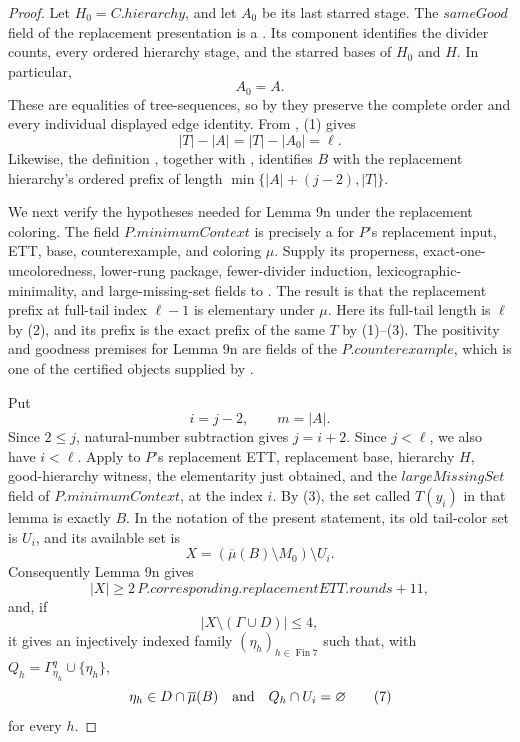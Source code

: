 \begin{proof}
Let \(H_0=C.\mathit{hierarchy}\), and let \(A_0\) be its last starred
stage.  The \(\mathit{sameGood}\) field of the replacement presentation is a
.  Its  component
identifies the divider counts, every ordered hierarchy stage, and the
starred bases of \(H_0\) and \(H\).  In particular,
\[
                         A_0=A.                              \tag{1}
\]
These are equalities of tree-sequences, so by
 they preserve the complete order and
every individual displayed edge identity.  From
, (1) gives
\[
 |T|-|A|=|T|-|A_0|=\ell.                                    \tag{2}
\]
Likewise, the definition , together with
, identifies \(B\) with the replacement
hierarchy's ordered prefix of length
\(\min\{|A|+(j-2),|T|\}\).                                  

We next verify the hypotheses needed for Lemma 9n under the replacement
coloring.  The field \(P.\mathit{minimumContext}\) is precisely a
 for \(P\)'s replacement
input, ETT, base, counterexample, and coloring \(\mu\).  Supply its
properness, exact-one-uncoloredness, lower-rung package, fewer-divider
induction, lexicographic-minimality, and large-missing-set fields to
.  The result is
that the replacement prefix at full-tail index \(\ell-1\) is elementary
under \(\mu\).  Here its full-tail length is \(\ell\) by (2), and its
prefix is the exact prefix of the same \(T\) by (1)--(3).  The positivity
and goodness premises for Lemma 9n are fields of the
 \(P.\mathit{counterexample}\), which is
one of the certified objects supplied by
.

Put
\[
                        i=j-2,\qquad m=|A|.
\]
Since \(2\le j\), natural-number subtraction gives \(j=i+2\).  Since
\(j<\ell\), we also have \(i<\ell\).  Apply  to \(P\)'s
replacement ETT, replacement base, hierarchy \(H\), good-hierarchy
witness, the elementarity just obtained, and the
\(\mathit{largeMissingSet}\) field of
\(P.\mathit{minimumContext}\), at the index \(i\).  By (3), the set
called \(T(y_i)\) in that lemma is exactly \(B\).  In the notation of the
present statement, its old tail-color set is \(U_i\), and its available
set is
\[
 X=(\overline\mu(B)\setminus M_0)\setminus U_i.              \tag{4}
\]
Consequently Lemma 9n gives
\[
 |X|\ge
 2\,P.\mathit{corresponding.replacementETT.rounds}+11,        \tag{5}
\]
and, if
\[
                      |X\setminus(\Gamma\cup D)|\le4,         \tag{6}
\]
it gives an injectively indexed family
\((\eta_h)_{h\in\operatorname{Fin}7}\) such that, with
\(Q_h=\Gamma^q_{\eta_h}\cup\{\eta_h\}\),
\[
 \eta_h\in D\cap\overline\mu(B)\quad\hbox{and}\quad
                         Q_h\cap U_i=\varnothing              \tag{7}
\]
for every \(h\).


\end{proof}
